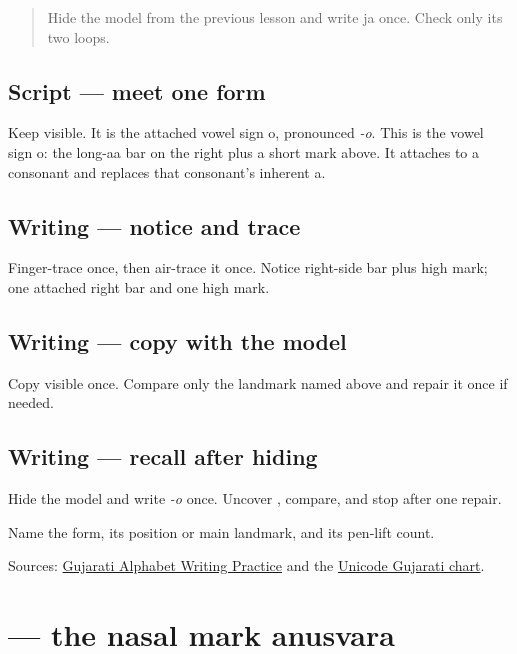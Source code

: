 \label{lesson:GU-W03-o-matra}



\begin{quote}
Hide the model from the previous lesson and write ja once. Check only its two loops.
\end{quote}

\subsection*{Script — meet one form}
Keep \textbf{} visible. It is the attached vowel sign o, pronounced \emph{-o}. This is the vowel sign o: the long-aa bar on the right plus a short mark above. It attaches to a consonant and replaces that consonant's inherent a.

\subsection*{Writing — notice and trace}

Finger-trace \textbf{} once, then air-trace it once. Notice right-side bar plus high mark; one attached right bar and one high mark.

\subsection*{Writing — copy with the model}
Copy visible \textbf{} once. Compare only the landmark named above and repair it once if needed.

\subsection*{Writing — recall after hiding}
Hide the model and write \emph{-o} once. Uncover \textbf{}, compare, and stop after one repair.

\begin{tcolorbox}[breakable,colback=teal!4,colframe=teal!35!black,title={Before you move on}]
Name the form, its position or main landmark, and its pen-lift count.

Sources: \href{https://www.t30apps.com/gujarati-alphabet-writing/}{Gujarati Alphabet Writing Practice} and the \href{https://www.unicode.org/charts/PDF/U0A80.pdf}{Unicode Gujarati chart}.
\end{tcolorbox}
\section[\texorpdfstring{\gu{ં} (ṃ)}{ં (ṃ)}]{ — the nasal mark anusvara}

